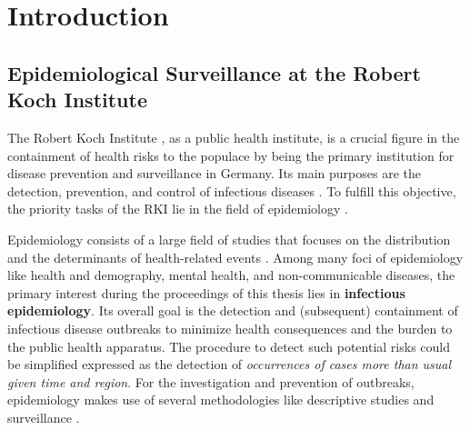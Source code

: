 \chapter{Introduction}

\section{Epidemiological Surveillance at the Robert Koch Institute}
  The Robert Koch Institute , as a public health institute, is a crucial figure in the containment of health risks to the populace by being the primary institution for disease prevention and surveillance in Germany.
  Its main purposes are the detection, prevention, and control of infectious diseases \citep{rki_definition}.
  To fulfill this objective, the priority tasks of the RKI lie in the field of epidemiology \citep{rki_definition}.

  Epidemiology consists of a large field of studies that focuses on the distribution and the determinants of health-related events \citep{WHOepi}.
  Among many foci of epidemiology like health and demography, mental health, and non-communicable diseases, the primary interest during the proceedings of this thesis lies in \textbf{infectious epidemiology}.
  Its overall goal is the detection and (subsequent) containment of infectious disease outbreaks to minimize health consequences and the burden to the public health apparatus.
  The procedure to detect such potential risks could be simplified expressed as the detection of \textit{occurrences of cases more than usual given time and region}.
  For the investigation and prevention of outbreaks, epidemiology makes use of several methodologies like descriptive studies and surveillance \citep{WHOepi}.

